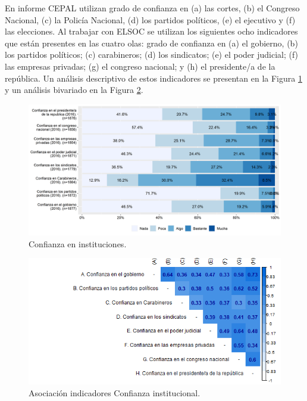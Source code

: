 \documentclass[
  12pt,
]{book}
\begin{document}
En informe CEPAL utilizan grado de confianza en (a) las cortes, (b) el Congreso Nacional, (c) la Policía Nacional, (d) los partidos políticos, (e) el ejecutivo y (f) las elecciones. Al trabajar con ELSOC se utilizan los siguientes ocho indicadores que están presentes en las cuatro olas: grado de confianza en (a) el gobierno, (b) los partidos políticos; (c) carabineros; (d) los sindicatos; (e) el poder judicial; (f) las empresas privadas; (g) el congreso nacional; y (h) el presidente/a de la república. Un análisis descriptivo de estos indicadores se presentan en la Figura \ref{fig:confianza-institucional} y un análisis bivariado en la Figura \ref{fig:confianza-institucional-cor}.

\begin{figure}[H]

{\centering \includegraphics[width=1\linewidth,height=1\textheight]{output/graphs/confianza-institucional} 

}

\caption{Confianza en instituciones.}\label{fig:confianza-institucional}
\end{figure}

\begin{figure}[H]

{\centering \includegraphics[width=1\linewidth,height=1\textheight]{output/graphs/confianza-institucional_cor} 

}

\caption{Asociación indicadores Confianza institucional.}\label{fig:confianza-institucional-cor}
\end{figure}
\end{document}

